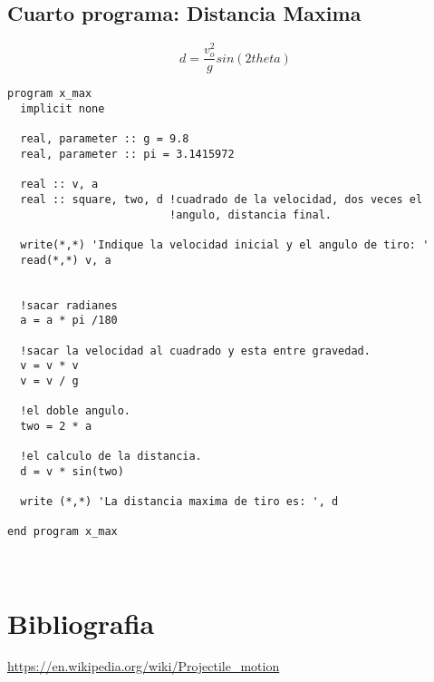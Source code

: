 \documentclass{article}
\begin{document}
\clearpage

\subsection{Cuarto programa: Distancia Maxima}
\begin {equation}
d = \frac {v^2_o} {g} sin(2theta)
\end {equation}
\begin{verbatim}
program x_max
  implicit none

  real, parameter :: g = 9.8
  real, parameter :: pi = 3.1415972

  real :: v, a
  real :: square, two, d !cuadrado de la velocidad, dos veces el
                         !angulo, distancia final. 

  write(*,*) 'Indique la velocidad inicial y el angulo de tiro: '
  read(*,*) v, a


  !sacar radianes
  a = a * pi /180
  
  !sacar la velocidad al cuadrado y esta entre gravedad.
  v = v * v
  v = v / g

  !el doble angulo.
  two = 2 * a

  !el calculo de la distancia.
  d = v * sin(two)

  write (*,*) 'La distancia maxima de tiro es: ', d

end program x_max
  
  
\end{verbatim}

\clearpage

\section{Bibliografia}
\url{https://en.wikipedia.org/wiki/Projectile_motion}
\end{document}
